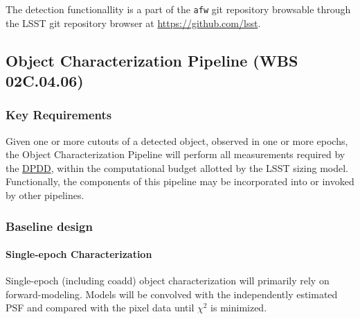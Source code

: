 \documentclass[12pt]{article}
\newcommand{\ds}[2]{{\color{blue} \href{https://docushare.lsstcorp.org/docushare/dsweb/Get/#1}{#2}}\xspace}
\newcommand{\DPDD}{\ds{LSE-163}{DPDD}}
\newcommand{\wbsPSF}{WBS 02C.04.03}
\newcommand{\wbsObjChar}{WBS 02C.04.06}
\begin{document}
The detection functionallity is a part of the {\tt afw} git repository browsable through the LSST git repository browser at \url{https://github.com/lsst}.

\clearpage

\subsection{Object Characterization Pipeline (\wbsObjChar)}

\subsubsection{Key Requirements}

Given one or more cutouts of a detected object, observed in one or more epochs, the Object Characterization Pipeline will perform all measurements required by the \DPDD, within the computational budget allotted by the LSST sizing model.
\\

Functionally, the components of this pipeline may be incorporated into or invoked by other pipelines.

\subsubsection{Baseline design}

\paragraph{Single-epoch Characterization}

Single-epoch (including coadd) object characterization will primarily rely on forward-modeling. Models will be convolved with the independently estimated PSF and compared with the pixel data until $\chi^2$ is minimized. %

\end{document}
